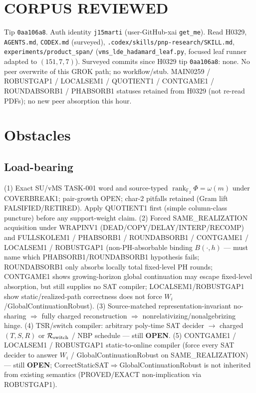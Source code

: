 \documentclass[11pt]{article}
\begin{document}
\section*{CORPUS REVIEWED}
Tip \texttt{0aa106a8}. Auth identity \texttt{j15marti} (user-GitHub-xai \texttt{get\_me}).
Read H0329,
\texttt{AGENTS.md}, \texttt{CODEX.md} (surveyed), \texttt{.codex/skills/pnp-research/SKILL.md},
\texttt{experiments/product\_span/}
(\texttt{vms\_lde\_hadamard\_leaf.py}, focused leaf runner adapted to $(151,7,7)$).
Surveyed commits since H0329 tip \texttt{0aa106a8}: none.
No peer overwrite of this GROK path; no workflow/stub.
MAIN0259 / ROBUSTGAP1 / LOCALSEM1 / QUOTIENT1 / CONTGAME1 / ROUNDABSORB1 / PHABSORB1
statuses retained from H0329 (not re-read PDFs); no new peer absorption this hour.

\section*{Obstacles}
\subsection*{Load-bearing}
(1) Exact SU/vMS TASK-001 word and source-typed
$\operatorname{rank}_{\mathbb F_2}\Phi=\omega(m)$ under COVERBREAK1; pair-growth OPEN;
char-$2$ pitfalls retained (Gram lift FALSIFIED/RETIRED). Apply QUOTIENT1 first
(simple column-class puncture) before any support-weight claim.
(2) Forced SAME\_REALIZATION acquisition under WRAPINV1
(DEAD/COPY/DELAY/INTERP/RECOMP) and FULLSKOLEM1 / PHABSORB1 / ROUNDABSORB1 / CONTGAME1 /
LOCALSEM1 / ROBUSTGAP1
(non-PH-absorbable binding $B(\cdot,h)$ --- must name which PHABSORB1/ROUNDABSORB1
hypothesis fails; ROUNDABSORB1 only absorbs locally total fixed-level PH rounds;
CONTGAME1 shows growing-horizon global continuation may escape fixed-level absorption,
but still supplies no SAT compiler; LOCALSEM1/ROBUSTGAP1 show static/realized-path
correctness does not force $W_i$/GlobalContinuationRobust).
(3) Source-matched representation-invariant no-sharing $\Rightarrow$ fully charged reconstruction
$\Rightarrow$ nonrelativizing/nonalgebrizing hinge.
(4) TSR/switch compiler: arbitrary poly-time SAT decider $\to$ charged $(T,S,R)$ or
$\mathcal R_{\rm switch}$ / NBP schedule --- still \textbf{OPEN}.
(5) CONTGAME1 / LOCALSEM1 / ROBUSTGAP1 static-to-online compiler (force every SAT decider to
answer $W_i$ / GlobalContinuationRobust on SAME\_REALIZATION) --- still \textbf{OPEN};
CorrectStaticSAT$\Rightarrow$GlobalContinuationRobust is not inherited from existing semantics
(PROVED/EXACT non-implication via ROBUSTGAP1).
\end{document}
